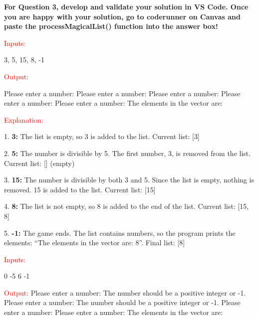 \textbf{For Question 3, develop and validate your solution in VS Code. Once you are happy with your solution, go to coderunner on Canvas and paste the processMagicalList() function into the answer box!}

\begin{sample}
\textcolor{red}{Inputs:}

3, 5, 15, 8, -1

\textcolor{red}{Output:}

Please enter a number: \newline
Please enter a number: \newline
Please enter a number: \newline
Please enter a number: \newline
Please enter a number: \newline
The elements in the vector are: 

\textcolor{red}{Explanation:}

1. \textbf{3:} The list is empty, so 3 is added to the list. \newline
   Current list: [3] \newline

2. \textbf{5:} The number is divisible by 5. The first number, 3, is removed from the list. \newline
   Current list: [] (empty) \newline

3. \textbf{15:} The number is divisible by both 3 and 5. Since the list is empty, nothing is removed. 15 is added to the list. \newline
   Current list: [15] \newline

4. \textbf{8:} The list is not empty, so 8 is added to the end of the list. \newline
   Current list: [15, 8] \newline

5. \textbf{-1:} The game ends. The list contains numbers, so the program prints the elements: ``The elements in the vector are: 8''. \newline
   Final list: [8]
\end{sample}

\begin{sample}
\textcolor{red}{Inputs:}

0 -5 6 -1

\textcolor{red}{Output:}
Please enter a number: \newline
The number should be a positive integer or -1. \newline
Please enter a number: \newline
The number should be a positive integer or -1. \newline
Please enter a number: \newline
Please enter a number: \newline
The elements in the vector are: 

\end{sample}

